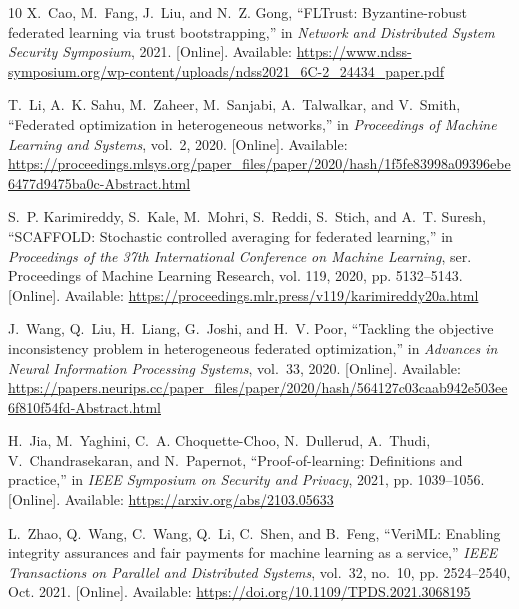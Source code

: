 \documentclass[conference]{IEEEtran}
\begin{document}
\begin{thebibliography}{10}
\BIBentryALTinterwordspacing
X.~Cao, M.~Fang, J.~Liu, and N.~Z. Gong, ``{FLTrust}: Byzantine-robust
  federated learning via trust bootstrapping,'' in \emph{Network and
  Distributed System Security Symposium}, 2021. [Online]. Available:
  \url{https://www.ndss-symposium.org/wp-content/uploads/ndss2021_6C-2_24434_paper.pdf}
\BIBentrySTDinterwordspacing

\BIBentryALTinterwordspacing
T.~Li, A.~K. Sahu, M.~Zaheer, M.~Sanjabi, A.~Talwalkar, and V.~Smith,
  ``Federated optimization in heterogeneous networks,'' in \emph{Proceedings of
  Machine Learning and Systems}, vol.~2, 2020. [Online]. Available:
  \url{https://proceedings.mlsys.org/paper_files/paper/2020/hash/1f5fe83998a09396ebe6477d9475ba0c-Abstract.html}
\BIBentrySTDinterwordspacing

\BIBentryALTinterwordspacing
S.~P. Karimireddy, S.~Kale, M.~Mohri, S.~Reddi, S.~Stich, and A.~T. Suresh,
  ``{SCAFFOLD}: Stochastic controlled averaging for federated learning,'' in
  \emph{Proceedings of the 37th International Conference on Machine Learning},
  ser. Proceedings of Machine Learning Research, vol. 119, 2020, pp.
  5132--5143. [Online]. Available:
  \url{https://proceedings.mlr.press/v119/karimireddy20a.html}
\BIBentrySTDinterwordspacing

\BIBentryALTinterwordspacing
J.~Wang, Q.~Liu, H.~Liang, G.~Joshi, and H.~V. Poor, ``Tackling the objective
  inconsistency problem in heterogeneous federated optimization,'' in
  \emph{Advances in Neural Information Processing Systems}, vol.~33, 2020.
  [Online]. Available:
  \url{https://papers.neurips.cc/paper_files/paper/2020/hash/564127c03caab942e503ee6f810f54fd-Abstract.html}
\BIBentrySTDinterwordspacing

\BIBentryALTinterwordspacing
H.~Jia, M.~Yaghini, C.~A. Choquette-Choo, N.~Dullerud, A.~Thudi,
  V.~Chandrasekaran, and N.~Papernot, ``Proof-of-learning: Definitions and
  practice,'' in \emph{IEEE Symposium on Security and Privacy}, 2021, pp.
  1039--1056. [Online]. Available: \url{https://arxiv.org/abs/2103.05633}
\BIBentrySTDinterwordspacing

\BIBentryALTinterwordspacing
L.~Zhao, Q.~Wang, C.~Wang, Q.~Li, C.~Shen, and B.~Feng, ``{VeriML}: Enabling
  integrity assurances and fair payments for machine learning as a service,''
  \emph{IEEE Transactions on Parallel and Distributed Systems}, vol.~32,
  no.~10, pp. 2524--2540, Oct. 2021. [Online]. Available:
  \url{https://doi.org/10.1109/TPDS.2021.3068195}
\BIBentrySTDinterwordspacing


\end{thebibliography}
\end{document}
